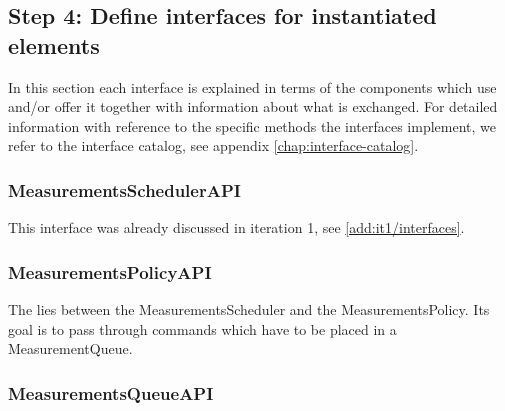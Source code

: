 % 
% 

\subsection{Step 4: Define interfaces for instantiated elements}
\label{add:it3/interfaces}

\npar In this section each interface is explained in terms of the components
which use and/or offer it together with information about what is exchanged. For
detailed information with reference to the specific methods the interfaces
implement, we refer to the interface catalog, see appendix
\ref{chap:interface-catalog}.

\subsubsection{MeasurementsSchedulerAPI}

\npar This interface was already discussed in iteration 1, see
\ref{add:it1/interfaces}.

\subsubsection{MeasurementsPolicyAPI}

\npar The  lies between the
MeasurementsScheduler and the MeasurementsPolicy. Its goal is to pass through
commands which have to be placed in a MeasurementQueue.

\subsubsection{MeasurementsQueueAPI}

